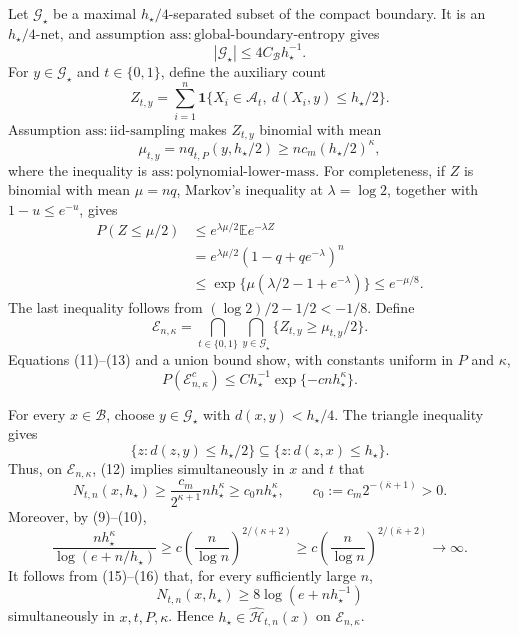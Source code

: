 Let \(\mathcal G_\star\) be a maximal \(h_\star/4\)-separated subset of the compact boundary. It is an \(h_\star/4\)-net, and assumption \(\mathrm{ass:global\text{-}boundary\text{-}entropy}\) gives
\[
|\mathcal G_\star|\le 4C_{\mathcal B}h_\star^{-1}. \tag{11}
\]
For \(y\in\mathcal G_\star\) and \(t\in\{0,1\}\), define the auxiliary count
\[
Z_{t,y}=\sum_{i=1}^n
\mathbf 1\{X_i\in\mathcal A_t,\ d(X_i,y)\le h_\star/2\}.
\]
Assumption \(\mathrm{ass:iid\text{-}sampling}\) makes \(Z_{t,y}\) binomial with mean
\[
\mu_{t,y}=nq_{t,P}(y,h_\star/2)
\ge nc_m(h_\star/2)^\kappa, \tag{12}
\]
where the inequality is \(\mathrm{ass:polynomial\text{-}lower\text{-}mass}\). For completeness, if \(Z\) is binomial with mean \(\mu=nq\), Markov's inequality at \(\lambda=\log2\), together with \(1-u\le e^{-u}\), gives
\[
\begin{aligned}
P(Z\le\mu/2)
&\le e^{\lambda\mu/2}\mathbb E e^{-\lambda Z}\\
&=e^{\lambda\mu/2}(1-q+qe^{-\lambda})^n\\
&\le\exp\{\mu(\lambda/2-1+e^{-\lambda})\}
\le e^{-\mu/8}.
\end{aligned}\tag{13}
\]
The last inequality follows from \((\log2)/2-1/2<-1/8\). Define
\[
\mathcal E_{n,\kappa}
=\bigcap_{t\in\{0,1\}}\bigcap_{y\in\mathcal G_\star}
\{Z_{t,y}\ge\mu_{t,y}/2\}.
\]
Equations (11)--(13) and a union bound show, with constants uniform in \(P\) and \(\kappa\),
\[
P(\mathcal E_{n,\kappa}^c)
\le C h_\star^{-1}\exp\{-cnh_\star^\kappa\}. \tag{14}
\]

For every \(x\in\mathcal B\), choose \(y\in\mathcal G_\star\) with \(d(x,y)<h_\star/4\). The triangle inequality gives
\[
\{z:d(z,y)\le h_\star/2\}
\subseteq\{z:d(z,x)\le h_\star\}.
\]
Thus, on \(\mathcal E_{n,\kappa}\), (12) implies simultaneously in \(x\) and \(t\) that
\[
N_{t,n}(x,h_\star)
\ge \frac{c_m}{2^{\kappa+1}}nh_\star^\kappa
\ge c_0nh_\star^\kappa, \qquad
c_0:=c_m2^{-(\overline\kappa+1)}>0. \tag{15}
\]
Moreover, by (9)--(10),
\[
\frac{nh_\star^\kappa}{\log(e+n/h_\star)}
\ge c\left(\frac{n}{\log n}\right)^{2/(\kappa+2)}
\ge c\left(\frac{n}{\log n}\right)^{2/(\overline\kappa+2)}
\longrightarrow\infty. \tag{16}
\]
It follows from (15)--(16) that, for every sufficiently large \(n\),
\[
N_{t,n}(x,h_\star)\ge8\log(e+nh_\star^{-1})
\]
simultaneously in \(x,t,P,\kappa\). Hence \(h_\star\in\widehat{\mathcal H}_{t,n}(x)\) on \(\mathcal E_{n,\kappa}\).

